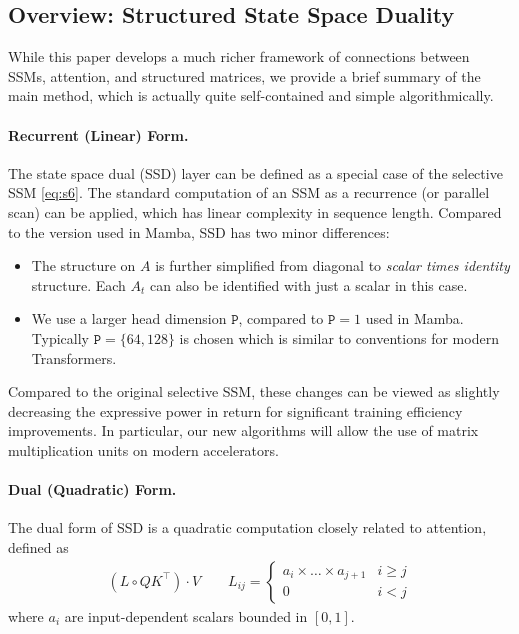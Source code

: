 \documentclass{article}
\begin{document}
\subsection{Overview: Structured State Space Duality}

While this paper develops a much richer framework of connections between SSMs, attention, and structured matrices, we provide a brief summary of the main method, which is actually quite self-contained and simple algorithmically.

\paragraph{Recurrent (Linear) Form.}
The state space dual (SSD) layer can be defined as a special case of the selective SSM \eqref{eq:s6}.
The standard computation of an SSM as a recurrence (or parallel scan) can be applied, which has linear complexity in sequence length.
Compared to the version used in Mamba, SSD has two minor differences:
\begin{itemize}
  \item The structure on $A$ is further simplified from diagonal to \emph{scalar times identity} structure.
    Each $A_t$ can also be identified with just a scalar in this case.
  \item We use a larger head dimension $\mathtt{P}$, compared to $\mathtt{P}=1$ used in Mamba. Typically $\mathtt{P}=\{64,128\}$ is chosen which is similar to conventions for modern Transformers. 
\end{itemize}
Compared to the original selective SSM, these changes can be viewed as slightly decreasing the expressive power in return for significant training efficiency improvements.
In particular, our new algorithms will allow the use of matrix multiplication units on modern accelerators.

\paragraph{Dual (Quadratic) Form.}

The dual form of SSD is a quadratic computation closely related to attention, defined as
\begin{align*}
  (L \circ QK^{\top}) \cdot V \qquad
  L_{ij} = \begin{cases}
    a_i \times \dots \times a_{j+1} & i \ge j \\
    0 & i < j
  \end{cases}
\end{align*}
where $a_i$ are input-dependent scalars bounded in $[0, 1]$.
\end{document}
